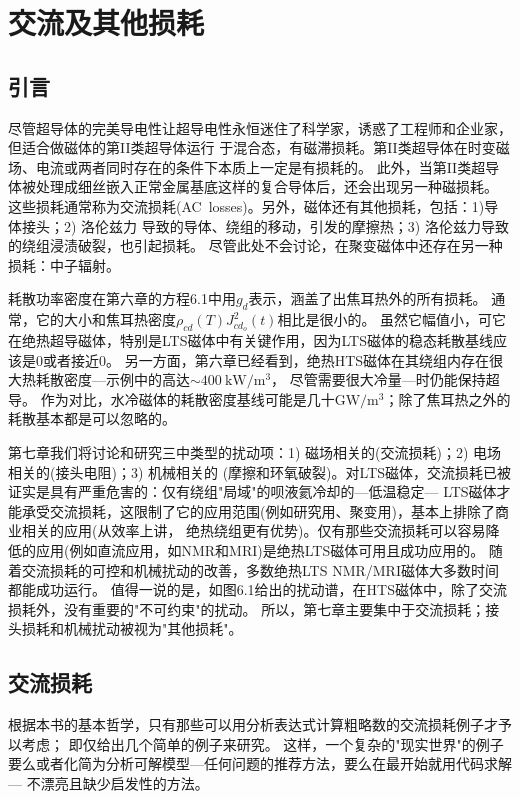 \chapter{交流及其他损耗}
\section{引言}
尽管超导体的完美导电性让超导电性永恒迷住了科学家，诱惑了工程师和企业家，但适合做磁体的第II类超导体运行
于混合态，有磁滞损耗。第II类超导体在时变磁场、电流或两者同时存在的条件下本质上一定是有损耗的。
此外，当第II类超导体被处理成细丝嵌入正常金属基底这样的复合导体后，还会出现另一种磁损耗。
这些损耗通常称为交流损耗(AC~losses)。另外，磁体还有其他损耗，包括：1)导体接头；2) 洛伦兹力
导致的导体、绕组的移动，引发的摩擦热；3) 洛伦兹力导致的绕组浸渍破裂，也引起损耗。
尽管此处不会讨论，在聚变磁体中还存在另一种损耗：中子辐射。

耗散功率密度在第六章的方程6.1中用$g_d$表示，涵盖了出焦耳热外的所有损耗。
通常，它的大小和焦耳热密度$\rho_{cd}(T)J_{cd_o}^2(t)$相比是很小的。
虽然它幅值小，可它在绝热超导磁体，特别是LTS磁体中有关键作用，因为LTS磁体的稳态耗散基线应该是0或者接近0。
另一方面，第六章已经看到，绝热HTS磁体在其绕组内存在很大热耗散密度---示例中的高达$\sim 400\ \mathrm{kW/m^3}$，
尽管需要很大冷量---时仍能保持超导。
作为对比，水冷磁体的耗散密度基线可能是几十$\mathrm{GW/m^3}$；除了焦耳热之外的耗散基本都是可以忽略的。

第七章我们将讨论和研究三中类型的扰动项：1) 磁场相关的(交流损耗)；2) 电场相关的(接头电阻)；3) 机械相关的
(摩擦和环氧破裂)。对LTS磁体，交流损耗已被证实是具有严重危害的：仅有绕组"局域"的呗液氦冷却的---低温稳定---
LTS磁体才能承受交流损耗，这限制了它的应用范围(例如研究用、聚变用)，基本上排除了商业相关的应用(从效率上讲，
绝热绕组更有优势)。仅有那些交流损耗可以容易降低的应用(例如直流应用，如NMR和MRI)是绝热LTS磁体可用且成功应用的。
随着交流损耗的可控和机械扰动的改善，多数绝热LTS NMR/MRI磁体大多数时间都能成功运行。
值得一说的是，如图6.1给出的扰动谱，在HTS磁体中，除了交流损耗外，没有重要的"不可约束"的扰动。
所以，第七章主要集中于交流损耗；接头损耗和机械扰动被视为"其他损耗"。

\section{交流损耗}
根据本书的基本哲学，只有那些可以用分析表达式计算粗略数的交流损耗例子才予以考虑；
即仅给出几个简单的例子来研究。
这样，一个复杂的"现实世界"的例子要么或者化简为分析可解模型---任何问题的推荐方法，要么在最开始就用代码求解---
不漂亮且缺少启发性的方法。

